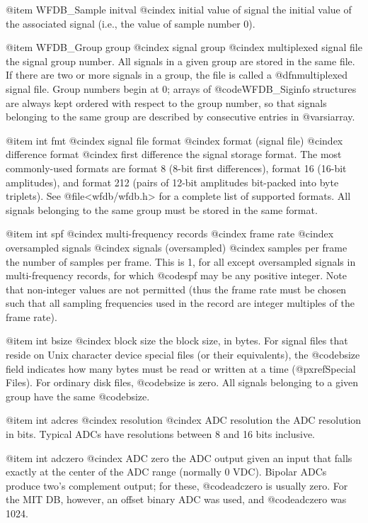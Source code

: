{{{{{{{{{{@item WFDB_Sample initval
@cindex initial value of signal
the initial value of the associated signal (i.e., the value of sample
number 0).

@item WFDB_Group group
@cindex signal group
@cindex multiplexed signal file
the signal group number.  All signals in a given group are stored in the
same file.  If there are two or more signals in a group, the file is
called a @dfn{multiplexed signal file}.  Group numbers begin at 0;
arrays of @code{WFDB_Siginfo} structures are always kept ordered with respect
to the group number, so that signals belonging to the same group are
described by consecutive entries in @var{siarray}.

@item int fmt
@cindex signal file format
@cindex format (signal file)
@cindex difference format
@cindex first difference
the signal storage format.  The most commonly-used formats are format 8
(8-bit first differences), format 16 (16-bit amplitudes), and format 212
(pairs of 12-bit amplitudes bit-packed into byte triplets).  See
@file{<wfdb/wfdb.h>} for a complete list of supported formats.  All signals
belonging to the same group must be stored in the same format.

@item int spf
@cindex multi-frequency records
@cindex frame rate
@cindex oversampled signals
@cindex signals (oversampled)
@cindex samples per frame
the number of samples per frame.  This is 1, for all except oversampled
signals in multi-frequency records, for which @code{spf} may be any
positive integer.  Note that non-integer values are not permitted (thus
the frame rate must be chosen such that all sampling frequencies used in
the record are integer multiples of the frame rate).

@item int bsize
@cindex block size
the block size, in bytes.  For signal files that reside on Unix character
device special files (or their equivalents), the @code{bsize} field
indicates how many bytes must be read or written at a time
(@pxref{Special Files}).  For ordinary disk files, @code{bsize} is zero.
All signals belonging to a given group have the same
@code{bsize}.

@item int adcres
@cindex resolution
@cindex ADC resolution
the ADC resolution in bits.  Typical ADCs have resolutions between 8 and 16
bits inclusive.

@item int adczero
@cindex ADC zero
the ADC output given an input that falls exactly at the center of the
ADC range (normally 0 VDC).  Bipolar ADCs produce two's complement
output; for these, @code{adczero} is usually zero.  For the MIT DB,
however, an offset binary ADC was used, and @code{adczero} was 1024.

}}}}}}}}}}
